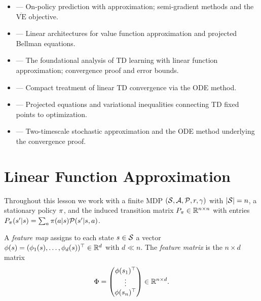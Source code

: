 \documentclass[11pt,a4paper]{article}
\begin{document}
\begin{itemize}[leftmargin=2em]
  \item \citet[Chapters 9--10]{suttonbarto2018} --- On-policy prediction
    with approximation; semi-gradient methods and the $\overline{\mathrm{VE}}$
    objective.
  \item \citet[Chapter 2]{bertsekas1996} --- Linear architectures for
    value function approximation and projected Bellman equations.
  \item \citet{tsitsiklis1997} --- The foundational analysis of TD
    learning with linear function approximation; convergence proof and
    error bounds.
  \item \citet[Section 5]{szepesvari2010} --- Compact treatment of
    linear TD convergence via the ODE method.
  \item \citet{bertsekas2009} --- Projected equations and variational
    inequalities connecting TD fixed points to optimization.
  \item \citet{borkar2008} --- Two-timescale stochastic approximation
    and the ODE method underlying the convergence proof.
\end{itemize}

\section{Linear Function Approximation}
\label{sec:linear_fa}

Throughout this lesson we work with a finite MDP
$(\mathcal{S}, \mathcal{A}, \mathcal{P}, r, \gamma)$ with $|\mathcal{S}| = n$,
a stationary policy $\pi$, and the induced transition matrix
$P_\pi \in \mathbb{R}^{n \times n}$ with entries
$P_\pi(s'|s) = \sum_a \pi(a|s)\mathcal{P}(s'|s,a)$.

\begin{definition}
\label{def:features}
A \emph{feature map} assigns to each state $s \in \mathcal{S}$ a vector
$\phi(s) = (\phi_1(s), \ldots, \phi_d(s))^\top \in \mathbb{R}^d$ with
$d \ll n$. The \emph{feature matrix} is the $n \times d$ matrix
\begin{equation}
  \Phi = \begin{pmatrix}
    \phi(s_1)^\top \\ \vdots \\ \phi(s_n)^\top
  \end{pmatrix}
  \in \mathbb{R}^{n \times d}.
  \label{eq:feature_matrix}
\end{equation}
\end{definition}
\end{document}
